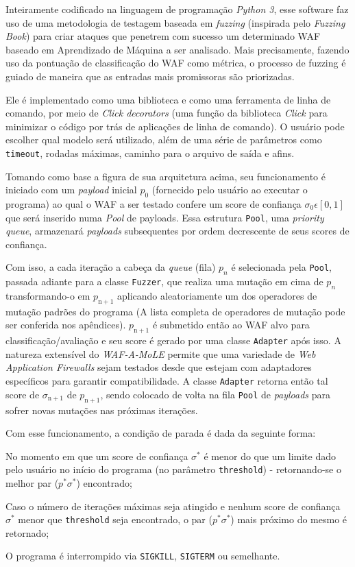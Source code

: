 Inteiramente codificado na linguagem de programação \textit{Python 3}, esse software faz uso de uma metodologia de testagem baseada em \textit{fuzzing} (inspirada pelo \textit{Fuzzing Book}) \cite{fuzzing_book} para criar ataques que penetrem com sucesso um determinado WAF baseado em Aprendizado de Máquina a ser analisado. Mais precisamente, fazendo uso da pontuação de classificação do WAF como métrica, o processo de fuzzing é guiado de maneira que as entradas mais promissoras são priorizadas.

Ele é implementado como uma biblioteca e como uma ferramenta de linha de comando, por meio de \textit{Click decorators} (uma função da biblioteca \textit{Click} para minimizar o código por trás de aplicações de linha de comando). O usuário pode escolher qual modelo será utilizado, além de uma série de parâmetros como \verb+timeout+, rodadas máximas, caminho para o arquivo de saída e afins.

Tomando como base a figura de sua arquitetura acima, seu funcionamento é iniciado com um \textit{payload} inicial $p_0$ (fornecido pelo usuário ao executar o programa) ao qual o WAF a ser testado confere um score de confiança $\sigma_0 \epsilon [0, 1]$ que será inserido numa \textit{Pool} de payloads. Essa estrutura \verb+Pool+, uma \textit{priority queue}, armazenará \textit{payloads} subsequentes por ordem decrescente de seus scores de confiança.

Com isso, a cada iteração a cabeça da \textit{queue} (fila) $p_n$ é selecionada pela \verb+Pool+, passada adiante para a classe \verb+Fuzzer+, que realiza uma mutação em cima de $p_n$ transformando-o em $p_{\mathrm{n+1}}$ aplicando aleatoriamente um dos operadores de mutação padrões do programa (A lista completa de operadores de mutação pode ser conferida nos apêndices). $p_{\mathrm{n+1}}$ é submetido então ao WAF alvo para classificação/avaliação e seu score é gerado por uma classe \verb+Adapter+ após isso. A natureza extensível do \textit{WAF-A-MoLE} permite que uma variedade de \textit{Web Application Firewalls} sejam testados desde que estejam com adaptadores específicos para garantir compatibilidade. A classe \verb+Adapter+ retorna então tal score de $\sigma_{\mathrm{n+1}}$ de $p_{\mathrm{n+1}}$, sendo colocado de volta na fila \verb+Pool+ de \textit{payloads} para sofrer novas mutações nas próximas iterações.

\bigskip 

Com esse funcionamento, a condição de parada é dada da seguinte forma:
\begin{alineas}
\item No momento em que um score de confiança $\sigma^*$ é menor do que um limite dado pelo usuário no início do programa (no parâmetro \verb+threshold+) - retornando-se o melhor par ($p^* \sigma^*$) encontrado;
\item Caso o número de iterações máximas seja atingido e nenhum score de confiança $\sigma^*$ menor que \verb+threshold+ seja encontrado, o par ($p^* \sigma^*$) mais próximo do mesmo é retornado;
\item O programa é interrompido via \verb+SIGKILL+, \verb+SIGTERM+ ou semelhante.
\end{alineas}

